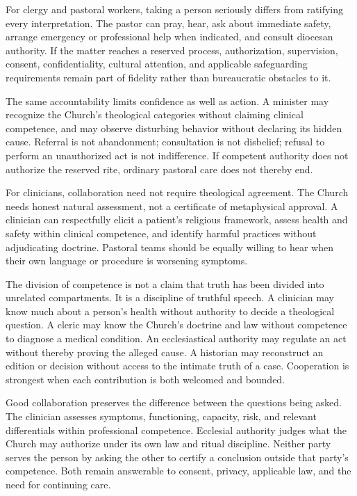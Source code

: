 For clergy and pastoral workers, taking a person seriously differs from
ratifying every interpretation. The pastor can pray, hear, ask about immediate
safety, arrange emergency or professional help when indicated, and consult
diocesan authority. If the
matter reaches a reserved process, authorization, supervision, consent,
confidentiality, cultural attention, and applicable safeguarding requirements remain
part of fidelity rather than bureaucratic obstacles to it.

The same accountability limits confidence as well as action. A minister may
recognize the Church's theological categories without claiming clinical
competence, and may observe disturbing behavior without declaring its hidden
cause. Referral is not abandonment; consultation is not disbelief; refusal to
perform an unauthorized act is not indifference. If competent authority does
not authorize the reserved rite, ordinary pastoral care does not thereby end.

For clinicians, collaboration need not require theological agreement. The
Church needs honest natural assessment, not a certificate of metaphysical
approval. A clinician can respectfully elicit a patient's religious framework,
assess health and safety within clinical competence, and identify harmful
practices without adjudicating doctrine. Pastoral teams should be equally
willing to hear when their own
language or procedure is worsening symptoms.

The division of competence is not a claim that truth has been divided into
unrelated compartments. It is a discipline of truthful speech. A clinician
may know much about a person's health without authority to decide a theological
question. A cleric may know the Church's doctrine and law without competence
to diagnose a medical condition. An ecclesiastical authority may regulate an
act without thereby proving the alleged cause. A historian may reconstruct an
edition or decision without access to the intimate truth of a case. Cooperation
is strongest when each contribution is both welcomed and bounded.

Good collaboration preserves the difference between the questions being
asked. The clinician assesses symptoms, functioning, capacity, risk, and
relevant differentials within professional competence. Ecclesial authority
judges what the Church may authorize under its own law and ritual discipline.
Neither party serves the person by asking the other to certify a conclusion
outside that party's competence. Both remain answerable to consent, privacy,
applicable law, and the need for continuing care.

